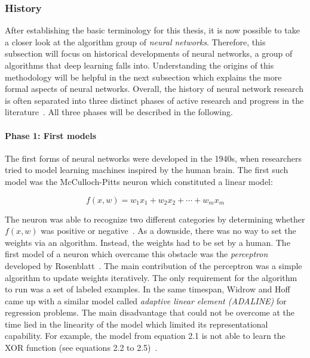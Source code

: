 \subsubsection{History}
\label{sub:dl_history}

After establishing the basic terminology for this thesis, 
it is now possible to take a closer look at the algorithm group of 
\textit{neural networks}. Therefore, this subsection will focus on historical
developments of neural networks, a group of algorithms that deep learning falls
into.
Understanding the origins of this methodology will be helpful in the next 
subsection which explains the more formal aspects of neural networks.
Overall, the history of neural network research is often separated into three
distinct phases of active research and progress in the literature~\cite{Goodfellow2016}.
All three phases will be described in the following.

\paragraph{Phase 1: First models}

The first forms of neural networks were developed in the 1940s, when
researchers tried to model learning machines inspired by the human brain.
The first such model was the McCulloch-Pitts neuron which constituted a linear
model:

\begin{equation}
  f (x, w) = w_1 x_1 + w_2 x_2 + \cdots + w_m x_m
\end{equation}

The neuron was able to recognize two different categories by determining
whether $f(x, w)$ was positive or negative~\cite{McCulloch1943}.
As a downside, there was no way to set the weights via an algorithm.
Instead, the weights had to be set by a human.
The first model of a neuron which overcame this obstacle was the \textit{perceptron}
developed by Rosenblatt~\cite{Rosenblatt1958}. The main contribution of the
perceptron was a simple algorithm to update weights iteratively.
The only requirement for the algorithm to run was a set of labeled examples.
In the same timespan, Widrow and Hoff~\cite{Widrow1960} came up with a similar
model called \textit{adaptive linear element (ADALINE)} for regression problems.
The main disadvantage that could not be overcome at the time lied in the 
linearity of the model which limited its representational capability.
For example, the model from equation 2.1 is not able to learn the XOR function 
(see equations 2.2 to 2.5)~\cite{Minsky1969}.

